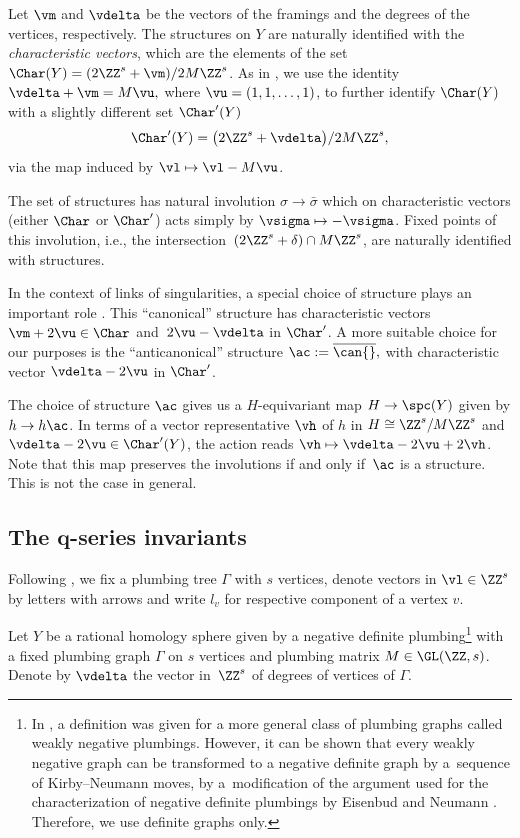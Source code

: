 \documentclass[10pt,a4paper]{amsart}
\begin{document}
Let $\vm$ and $\vdelta$ be the vectors of the framings and the degrees of the vertices, respectively. The \spc{} structures on $Y$ are naturally identified with the \emph{characteristic vectors}, which are the elements of the set
$\Char(Y) = (2\ZZ^s+\vm)/2M\ZZ^s$.
As in \cite{GM21}, we use the identity $\vdelta + \vm = M\vu,$ where $\vu = (1, 1, \dots, 1)$,
to further identify $\Char(Y)$ with a slightly different set $\Char'(Y)$
\begin{equation}\label{eq:char}
	\Char'(Y) = \bigl(2\ZZ^s+\vdelta\bigr)/2M\ZZ^s,
\end{equation}
via the map induced by $\vl \mapsto \vl - M\vu$.

The set of \spc{} structures has natural involution $\sigma \rightarrow \bar \sigma$ which on characteristic vectors (either $\Char$ or $\Char'$) acts simply by $\vsigma \mapsto -\vsigma$. Fixed points of this involution, i.e., the intersection~${(2\ZZ^s+\delta) \cap M\ZZ^s}$, are naturally identified with \spin{} structures. %

In the context of links of singularities, a special choice of \spc{} structure plays an important role \cite{NeNi02}. This ``canonical'' \spc{} structure \can{} has characteristic vectors $\vm + 2\vu \in \Char$ and~${2\vu - \vdelta}$ in $\Char'$. A more suitable choice for our purposes is the ``anticanonical'' \spc{} structure $\ac := \overline{\can{}},$ with characteristic vector $\vdelta - 2\vu$ in $\Char'$.

The choice of \spc{} structure $\ac$ gives us a $H$-equivariant map $H \rightarrow \spc(Y)$ given by $h \rightarrow h\ac$. In terms of a vector representative $\vh$ of $h$ in $H \cong \ZZ^s/M\ZZ^s$ and $\vdelta - 2\vu \in \Char'(Y)$, the action reads $\vh \mapsto \vdelta - 2\vu + 2\vh$. Note that this map preserves the involutions if and only if~$\ac$ is a \spin{} structure. This is not the case in general.

\subsection[The q-series invariants]{The $\boldsymbol{q}$-series invariants}\label{Zhat_review}

Following \cite{GM21}, we fix a plumbing tree $\Gamma$ with $s$ vertices, denote vectors in $\vl \in \ZZ^s$ by letters with arrows and write $l_v$ for respective component of a vertex $v$.

Let $Y$ be a rational homology sphere given by a negative definite plumbing\footnote{In \cite{GM21}, a definition was given for a more general class of plumbing graphs called weakly negative plumbings. However, it can be shown that every weakly negative graph can be transformed to a negative definite graph by a~sequence of Kirby--Neumann moves, by a~modification of the argument used for the characterization of negative definite plumbings by Eisenbud and Neumann \cite{EN86}. Therefore, we use definite graphs only.} with a fixed plumbing graph $\Gamma$ on $s$ vertices and plumbing matrix $M \in \GL(\ZZ, s)$. Denote by $\vdelta$ the vector in~$\ZZ^s$ of degrees of vertices of $\Gamma$.
\end{document}
